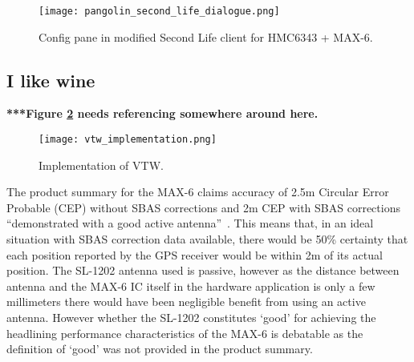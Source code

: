 \begin{figure}[h]
\centering
  \texttt{[image: pangolin\_second\_life\_dialogue.png]}
  \caption{Config pane in modified Second Life client for HMC6343 + MAX-6.}
  \label{pangolin_second_life_dialogue.png}
\end{figure}
















\subsection{I like wine}

\textbf{***Figure \ref{vtw_implementation.png} needs referencing somewhere around here.}

\begin{figure}[h]
\centering
  \texttt{[image: vtw\_implementation.png]}
  \caption{Implementation of VTW.}
  \label{vtw_implementation.png}
\end{figure}

The product summary for the MAX-6 claims accuracy of 2.5m Circular Error Probable (CEP) without SBAS corrections and 2m CEP with SBAS corrections ``demonstrated with a good active antenna''~\cite{U-bloxAG2012}. This means that, in an ideal situation with SBAS correction data available, there would be 50\% certainty that each position reported by the GPS receiver would be within 2m of its actual position. The SL-1202 antenna used is passive, however as the distance between antenna and the MAX-6 IC itself in the hardware application is only a few millimeters there would have been negligible benefit from using an active antenna. However whether the SL-1202 constitutes `good' for achieving the headlining performance characteristics of the MAX-6 is debatable as the definition of `good' was not provided in the product summary.

